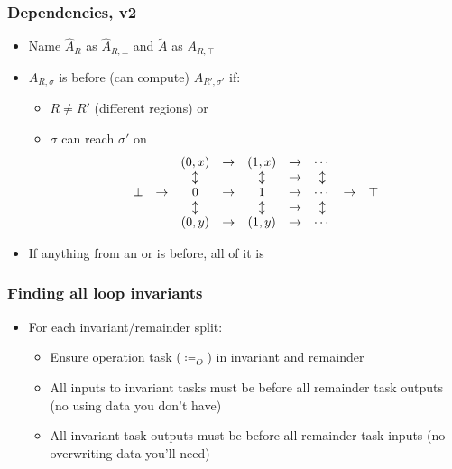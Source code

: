 \documentclass{beamer}
\begin{document}
\begin{frame}
  \frametitle{Dependencies, v2}
  \begin{itemize}
  \item Name $\hat{A}_R$ as $\hat{A}_{R, \bot}$ and $\widetilde{A}$ as $A_{R, \top}$
  \item $A_{R, \sigma}$ is before (can compute) $A_{R', \sigma'}$ if:
    \begin{itemize}
    \item $R \neq R'$ (different regions) or
    \item $\sigma$ can reach $\sigma'$ on
      \begin{equation*}
        \begin{array}{c c c c c c c c c}
           & &(0, x)&\to&(1, x)&\to&\cdots& &\\
           & &\updownarrow     & &\updownarrow     &\to&\updownarrow& &\\
          \bot&\to&0     &\to&1     &\to&\cdots&\to&\top\\
           & &\updownarrow     & &\updownarrow     &\to&\updownarrow& &\\
           & &(0, y)&\to&(1, y)&\to&\cdots& &\\
        \end{array}
      \end{equation*}
    \end{itemize}
  \item If anything from an or is before, all of it is
  \end{itemize}
\end{frame}

\begin{frame}
  \frametitle{Finding all loop invariants}
  \begin{itemize}
  \item For each invariant/remainder split:
    \begin{itemize}
    \item Ensure operation task ($\coloneqq_O$) in invariant and remainder
    \item All inputs to invariant tasks must be before all remainder task outputs (no using data you don't have)
    \item All invariant task outputs must be before all remainder task inputs (no overwriting data you'll need)
    \end{itemize}
  \end{itemize}
\end{frame}
\end{document}
